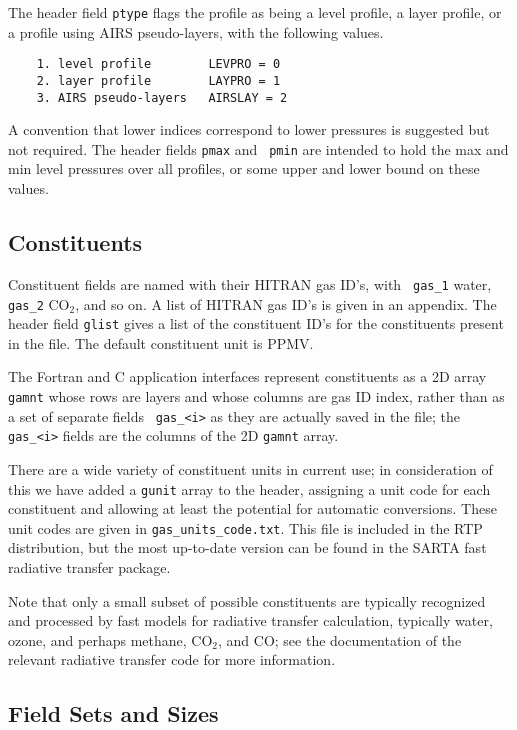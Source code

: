 \documentclass[12pt]{article}
\begin{document}
The header field {\tt ptype} flags the profile as being a level
profile, a layer profile, or a profile using AIRS pseudo-layers,
with the following values.

{\small
\begin{verbatim}
    1. level profile        LEVPRO = 0
    2. layer profile        LAYPRO = 1
    3. AIRS pseudo-layers   AIRSLAY = 2
\end{verbatim}
}

A convention that lower indices correspond to lower pressures is
suggested but not required.  The header fields {\tt pmax} and {\tt
pmin} are intended to hold the max and min level pressures over all
profiles, or some upper and lower bound on these values.

\subsection{Constituents}

Constituent fields are named with their HITRAN gas ID's, with {\tt
gas\_1} water, {\tt gas\_2} CO$_2$, and so on.  A list of HITRAN
gas ID's is given in an appendix.  The header field {\tt glist}
gives a list of the constituent ID's for the constituents present
in the file.  The default constituent unit is PPMV.

The Fortran and C application interfaces represent constituents as
a 2D array {\tt gamnt} whose rows are layers and whose columns are
gas ID index, rather than as a set of separate fields {\tt
gas\_<i>} as they are actually saved in the file; the {\tt
gas\_<i>} fields are the columns of the 2D {\tt gamnt} array.

There are a wide variety of constituent units in current use; in
consideration of this we have added a {\tt gunit} array to the
header, assigning a unit code for each constituent and allowing at
least the potential for automatic conversions.  These unit codes are
given in {\tt gas\_units\_code.txt}.  This file is included in the
RTP distribution, but the most up-to-date version can be found in
the SARTA fast radiative transfer package.

Note that only a small subset of possible constituents are typically
recognized and processed by fast models for radiative transfer
calculation, typically water, ozone, and perhaps methane, CO$_2$,
and CO; see the documentation of the relevant radiative transfer
code for more information.


\subsection{Field Sets and Sizes}
\end{document}
